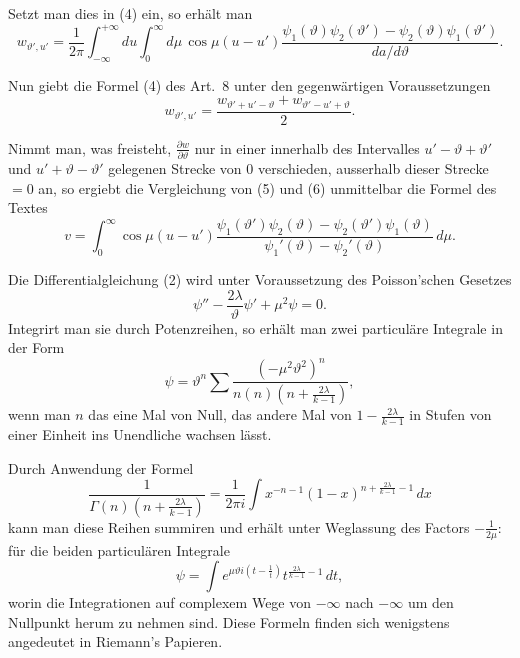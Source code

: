 \documentclass[12pt,a4paper]{article}
\begin{document}
Setzt man dies in (4) ein, so erh\"alt man
\begin{equation*}
w_{\vartheta',u'} = \frac{1}{2\pi}\int_{-\infty}^{+\infty}du\int_{0}^{\infty}d\mu\,\cos\mu(u - u')\frac{\psi_{1}(\vartheta)\psi_{2}(\vartheta') - \psi_{2}(\vartheta)\psi_{1}(\vartheta')}{da/d\vartheta}.\tag{5}
\end{equation*}

Nun giebt die Formel (4) des Art.~8 unter den gegenw\"artigen Voraussetzungen
\begin{equation*}
w_{\vartheta',u'} = \frac{w_{\vartheta'+u'-\vartheta} + w_{\vartheta'-u'+\vartheta}}{2}.\tag{6}
\end{equation*}

Nimmt man, was freisteht, $\frac{\partial w}{\partial\vartheta}$ nur in einer innerhalb des Intervalles $u' - \vartheta + \vartheta'$ und $u' + \vartheta - \vartheta'$ gelegenen Strecke von $0$ verschieden, ausserhalb dieser Strecke $= 0$ an, so ergiebt die Vergleichung von (5) und (6) unmittelbar die Formel des Textes
\[
v = \int_{0}^{\infty}\cos\mu(u - u')\frac{\psi_{1}(\vartheta')\psi_{2}(\vartheta) - \psi_{2}(\vartheta')\psi_{1}(\vartheta)}{\psi_{1}'(\vartheta) - \psi_{2}'(\vartheta)}\,d\mu.
\]

Die Differentialgleichung (2) wird unter Voraussetzung des Poisson'schen Gesetzes
\[
\psi'' - \frac{2\lambda}{\vartheta}\psi' + \mu^{2}\psi = 0.
\]
Integrirt man sie durch Potenzreihen, so erh\"alt man zwei particul\"are Integrale in der Form
\[
\psi = \vartheta^{n}\sum\frac{(-\mu^{2}\vartheta^{2})^{n}}{n(n)(n + \frac{2\lambda}{k-1})},
\]
wenn man $n$ das eine Mal von Null, das andere Mal von $1 - \frac{2\lambda}{k-1}$ in Stufen von einer Einheit ins Unendliche wachsen l\"asst.

Durch Anwendung der Formel
\[
\frac{1}{\Gamma(n)(n + \frac{2\lambda}{k-1})} = \frac{1}{2\pi i}\int x^{-n-1}(1 - x)^{n + \frac{2\lambda}{k-1} - 1}\,dx
\]
kann man diese Reihen summiren und erh\"alt unter Weglassung des Factors $-\frac{1}{2\mu}$: f\"ur die beiden particul\"aren Integrale
\[
\psi = \int e^{\mu\vartheta i(t - \frac{1}{t})}t^{\frac{2\lambda}{k-1} - 1}\,dt,
\]
worin die Integrationen auf complexem Wege von $-\infty$ nach $-\infty$ um den Nullpunkt herum zu nehmen sind. Diese Formeln finden sich wenigstens angedeutet in Riemann's Papieren.
\end{document}

